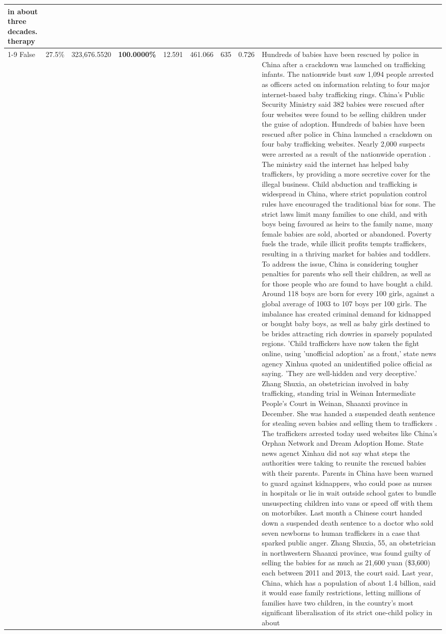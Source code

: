 \begin{table}[H]
\begin{tabular}{lllrlllll}
in about three decades. therapy \\
\cline{1-9}
False & 27.5\% & 323,676.5520 & \bfseries \color{red} 100.0000\% & 12.591 & 461.066 & 635 & 0.726 & Hundreds of babies have been rescued by police in China after a crackdown was launched on trafficking infants. The nationwide bust saw 1,094 people arrested as officers acted on information relating to four major internet-based baby trafficking rings. China's Public Security Ministry said 382 babies were rescued after four websites were found to be selling children under the guise of adoption. Hundreds of babies have been rescued after police in China launched a crackdown on four baby trafficking websites. Nearly 2,000 suspects were arrested as a result of the nationwide operation . The ministry said the internet has helped baby traffickers, by providing a more secretive cover for the illegal business. Child abduction and trafficking is widespread in China, where strict population control rules have encouraged the traditional bias for sons. The strict laws limit many families to one child, and with boys being favoured as heirs to the family name, many female babies are sold, aborted or abandoned. Poverty fuels the trade, while illicit profits tempts traffickers, resulting in a thriving market for babies and toddlers. To address the issue, China is considering tougher penalties for parents who sell their children, as well as for those people who are found to have bought a child. Around 118 boys are born for every 100 girls, against a global average of 1003 to 107 boys per 100 girls. The imbalance has created criminal demand for kidnapped or bought baby boys, as well as baby girls destined to be brides attracting rich dowries in sparsely populated regions. 'Child traffickers have now taken the fight online, using 'unofficial adoption' as a front,' state news agency Xinhua quoted an unidentified police official as saying. 'They are well-hidden and very deceptive.' Zhang Shuxia, an obstetrician involved in baby trafficking, standing trial in Weinan Intermediate People's Court in Weinan, Shaanxi province in December. She was handed a suspended death sentence for stealing seven babies and selling them to traffickers . The traffickers arrested today used websites like China's Orphan Network and Dream Adoption Home. State news agenct Xinhau did not say what steps the authorities were taking to reunite the rescued babies with their parents. Parents in China have been warned to guard against kidnappers, who could pose as nurses in hospitals or lie in wait outside school gates to bundle unsuspecting children into vans or speed off with them on motorbikes. Last month a Chinese court handed down a suspended death sentence to a doctor who sold seven newborns to human traffickers in a case that sparked public anger. Zhang Shuxia, 55, an obstetrician in northwestern Shaanxi province, was found guilty of selling the babies for as much as 21,600 yuan (\$3,600) each between 2011 and 2013, the court said. Last year, China, which has a population of about 1.4 billion, said it would ease family restrictions, letting millions of families have two children, in the country's most significant liberalisation of its strict one-child policy in about 
\end{tabular}
\end{table}
